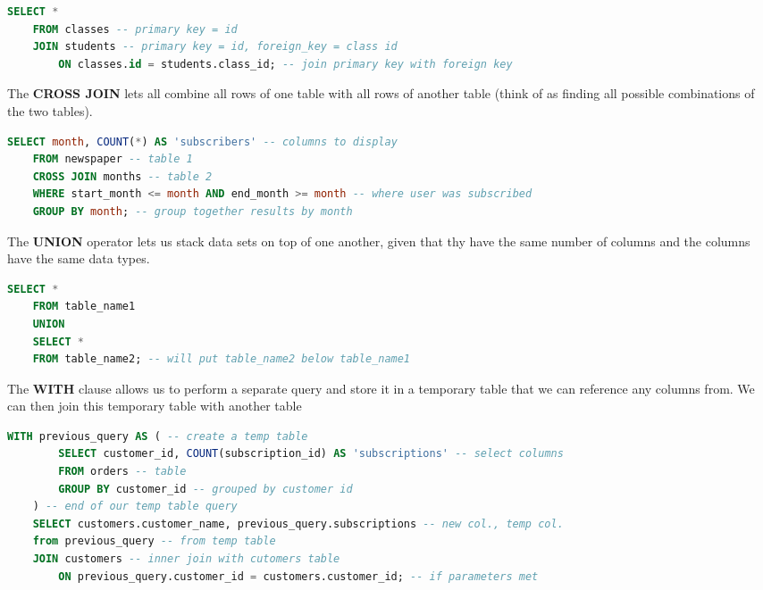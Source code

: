 \documentclass[11pt, a4paper]{article}
\begin{document}
\begin{spacing}{1.1}
\begin{lstlisting}[language=SQL]
	SELECT * 
	FROM classes -- primary key = id
	JOIN students -- primary key = id, foreign_key = class id 
		ON classes.id = students.class_id; -- join primary key with foreign key \end{lstlisting} \vspace*{1mm}
	The \textbf{CROSS JOIN} lets all combine all rows of one table with all rows of another table (think of as finding all possible combinations of the two tables).
	\begin{lstlisting}[language=SQL]
	SELECT month, COUNT(*) AS 'subscribers' -- columns to display
	FROM newspaper -- table 1
	CROSS JOIN months -- table 2
	WHERE start_month <= month AND end_month >= month -- where user was subscribed
	GROUP BY month; -- group together results by month \end{lstlisting}\vspace*{1mm}
	The \textbf{UNION} operator lets us stack data sets on top of one another, given that thy have the same number of columns and the columns have the same data types.
	\begin{lstlisting}[language=SQL]
	SELECT *
	FROM table_name1
	UNION
	SELECT * 
	FROM table_name2; -- will put table_name2 below table_name1 \end{lstlisting} \newpage
	\noindent The \textbf{WITH} clause allows us to perform a separate query and store it in a temporary table that we can reference any columns from. We can then join this temporary table with another table
	\begin{lstlisting}[language=SQL]
	WITH previous_query AS ( -- create a temp table
		SELECT customer_id, COUNT(subscription_id) AS 'subscriptions' -- select columns
		FROM orders -- table
		GROUP BY customer_id -- grouped by customer id
	) -- end of our temp table query
	SELECT customers.customer_name, previous_query.subscriptions -- new col., temp col.
	from previous_query -- from temp table
	JOIN customers -- inner join with cutomers table
		ON previous_query.customer_id = customers.customer_id; -- if parameters met \end{lstlisting} \vspace*{4mm}
		

\end{spacing}
\end{document}
